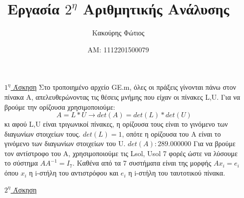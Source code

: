 \documentclass[12pt]{article}
\begin{document}
\title{Εργασία $2^\eta$ Αριθμητικής Ανάλυσης}
\date{ΑΜ: 1112201500079}
\author{Κακούρης Φώτιος}
\maketitle{}
    
\begin{enumerate}
    \item[\underline{$1^\eta$ Άσκηση}] Στο τροποιημένο αρχείο \textlatin{GE.m}, όλες οι πράξεις γίνονται πάνω στον πίνακα Α, 
    απελευθερώνοντας τις θέσεις μνήμης που είχαν οι πίνακες \textlatin{L,U}. \newline
    Για να βρούμε την ορίζουσα χρησιμοποιούμε: $$ A=L*U \rightarrow det(A)=det(L)*det(U) $$ κι αφού \textlatin{L,U} είναι τριγωνικοί πίνακες, η ορίζουσα τους είναι 
    το γινόμενο των διαγωνίων στοιχείων τους. $det(L)=1$, οπότε η ορίζουσα του Α είναι το γινόμενο των διαγωνίων στοιχείων του \textlatin{U}.  $det(A): 289.000000$ \newline
    Για να βρούμε τον αντίστροφο του Α, χρησιμοποιούμε τις \textlatin{Lsol, Usol} 7 φορές ώστε να λύσουμε το σύστημα $ AΑ^{-1} = I_7 $. Καθένα από τα 7 συστήματα είναι 
    της μορφής $A x_i = e_i $ όπου $x_i$ η \textlatin{i}-στήλη του αντιστρόφου και $e_i$ η \textlatin{i}-στήλη του ταυτοτικού πίνακα.


    \item[\underline{$2^\eta$ Άσκηση}]  
 


\end{enumerate}
\end{document}
